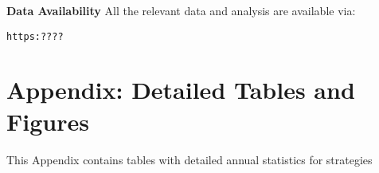 \documentclass{article}
\begin{document}
\begin{comment}
\medskip
\noindent
{\bf Acknowledgements}
We want to thank Metropolitan College Boston University, for their support.
\end{comment}


\medskip
\noindent
{\bf Data Availability}
All the relevant data and analysis are available via:
\begin{verbatim}
https:????
\end{verbatim}













\newpage




\newpage
\section{Appendix: Detailed Tables and Figures}

This Appendix contains tables with detailed annual statistics for strategies
\end{document}
